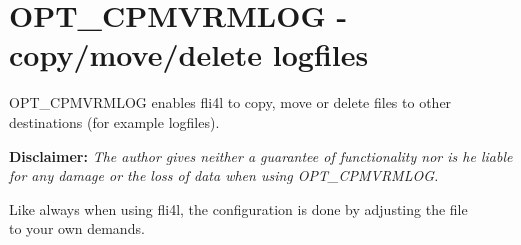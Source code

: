 
\section {OPT\_CPMVRMLOG - copy/move/delete logfiles}

OPT\_CPMVRMLOG enables fli4l to copy, move or delete files to other destinations (for example logfiles).

\textbf{Disclaimer: }\emph{The author gives neither a guarantee of functionality 
nor is he liable for any damage or the loss of data when using OPT\_\-CPMVRMLOG.}



Like always when using fli4l, the configuration is done by adjusting the file\\
 to your own demands.

